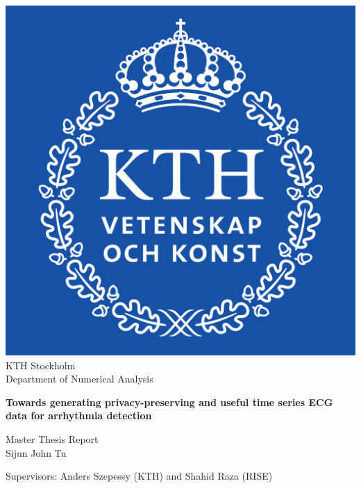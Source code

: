 \begin{titlepage}
	\begin{center}
		\vspace*{1cm}
		\includegraphics[scale=0.1]{pictures/KTH_Royal_Institute_of_Technology_logo.svg.png}\\
		\Large
		KTH Stockholm\\
		Department of Numerical Analysis
		\vspace*{1cm}



		\Huge
		\textbf{Towards generating privacy-preserving and useful time series ECG data for arrhythmia detection
		}
		
		\vspace{0.5cm}
		
		\vspace{1.5cm}
		
		
		\vfill
		
		Master Thesis Report \\
		Sijun John Tu
		\vspace{0.8cm}

		
		\large
		Supervisors: Anders Szepessy (KTH) and Shahid Raza (RISE)\\
		
	\end{center}
\end{titlepage}